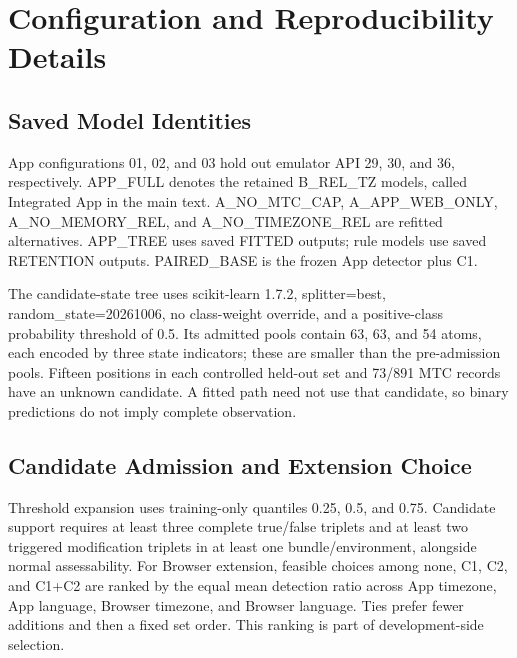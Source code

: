 \hypertarget{app:main}{%
\section{Configuration and Reproducibility Details}\label{app:main}}

\hypertarget{app:1}{%
\subsection{Saved Model Identities}\label{app:1}}

App configurations 01, 02, and 03 hold out emulator API 29, 30, and 36, respectively. APP\_\allowbreak{}FULL denotes the retained B\_\allowbreak{}REL\_\allowbreak{}TZ models, called Integrated App in the main text. A\_\allowbreak{}NO\_\allowbreak{}MTC\_\allowbreak{}CAP, A\_\allowbreak{}APP\_\allowbreak{}WEB\_\allowbreak{}ONLY, A\_\allowbreak{}NO\_\allowbreak{}MEMORY\_\allowbreak{}REL, and A\_\allowbreak{}NO\_\allowbreak{}TIMEZONE\_\allowbreak{}REL are refitted alternatives. APP\_\allowbreak{}TREE uses saved FITTED outputs; rule models use saved RETENTION outputs. PAIRED\_\allowbreak{}BASE is the frozen App detector plus C1.

The candidate-state tree uses scikit-learn 1.7.2, splitter=best, random\_\allowbreak{}state=20261006, no class-weight override, and a positive-class probability threshold of 0.5. Its admitted pools contain 63, 63, and 54 atoms, each encoded by three state indicators; these are smaller than the pre-admission pools. Fifteen positions in each controlled held-out set and 73/891 MTC records have an unknown candidate. A fitted path need not use that candidate, so binary predictions do not imply complete observation.

\hypertarget{app:2}{%
\subsection{Candidate Admission and Extension Choice}\label{app:2}}

Threshold expansion uses training-only quantiles 0.25, 0.5, and 0.75. Candidate support requires at least three complete true/false triplets and at least two triggered modification triplets in at least one bundle/environment, alongside normal assessability. For Browser extension, feasible choices among none, C1, C2, and C1+C2 are ranked by the equal mean detection ratio across App timezone, App language, Browser timezone, and Browser language. Ties prefer fewer additions and then a fixed set order. This ranking is part of development-side selection.

